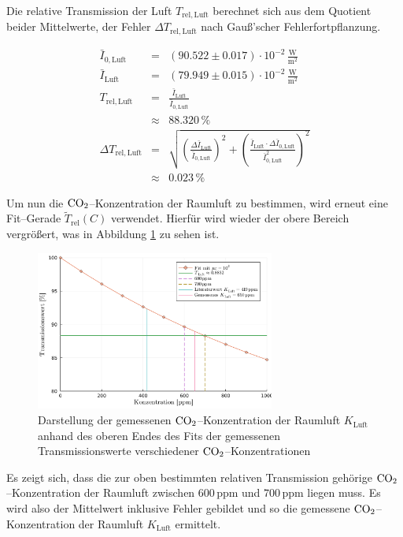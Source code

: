 \documentclass[12pt,a4paper]{scrartcl}
\numberwithin{equation}{section} %
\begin{document}
Die relative Transmission der Luft $T_\mathrm{rel, Luft}$ berechnet sich aus dem Quotient beider Mittelwerte, der Fehler $\Delta T_\mathrm{rel, Luft}$ nach Gauß'scher Fehlerfortpflanzung.

\begin{eqnarray}
  \bar{I}_{0, \mathrm{Luft}} &=& (90.522\pm 0.017) \cdot 10^{-2} \mathrm{\,\frac{W}{m^2}}\\
  \bar{I}_\mathrm{Luft} &=& (79.949 \pm 0.015) \cdot 10^{-2} \mathrm{\, \frac{W}{m^2}} \\
  T_\mathrm{rel, Luft} &=& \frac{\bar{I}_\mathrm{Luft}}{\bar{I}_{0, \mathrm{Luft}}} \\
  &\approx& 88.320 \mathrm{\, \%} \\
  \Delta T_\mathrm{rel, Luft} &=&
  \sqrt{
    \left(
    \frac{\Delta \bar{I}_\mathrm{Luft}}{\bar{I}_{0, \mathrm{Luft}}}
    \right)^2
    + \left(
    \frac{\bar{I}_\mathrm{Luft} \cdot \Delta \bar{I}_{0, \mathrm{Luft}}}{\bar{I}_{0, \mathrm{Luft}}^2}
    \right)^2
  } \\
  &\approx& 0.023 \mathrm{\, \%}
\end{eqnarray}

\noindent
Um nun die $\ce{CO_2}$--Konzentration der Raumluft zu bestimmen, wird erneut eine Fit--Gerade $\tilde{T}_\mathrm{rel}(C)$ verwendet. Hierfür wird wieder der obere Bereich vergrößert, was in Abbildung \ref{fig:luftZoom} zu sehen ist.

\begin{figure}[h!]
  \centering
  \includegraphics[width=0.7\textwidth]{../media/B1.1/luftZoomPpm.pdf}
  \caption{Darstellung der gemessenen $\ce{CO_2}$--Konzentration der Raumluft $K_\mathrm{Luft}$ anhand des oberen Endes des Fits der gemessenen Transmissionswerte verschiedener $\ce{CO_2}$--Konzentrationen}
  \label{fig:luftZoom}
\end{figure}

Es zeigt sich, dass  die zur oben bestimmten relativen Transmission gehörige $\ce{CO_2}$--Konzentration der Raumluft zwischen $600 \mathrm{\, ppm}$ und $700 \mathrm{\, ppm}$ liegen muss. Es wird also der Mittelwert inklusive Fehler gebildet und so die gemessene $\ce{CO_2}$--Konzentration der Raumluft $K_\mathrm{Luft}$ ermittelt.
\end{document}
